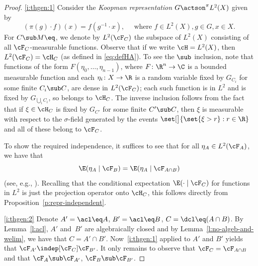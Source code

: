 \skpt
\begin{proof}
\eqref{i:thgen:1}
Consider the \emph{Koopman representation} $G \actson^\pi L^2(X)$ given by
\begin{equation*}
(\pi(g) \cdot f)(x) = f(g^{-1} \cdot x), \quad \text{ where } f \in L^2(X), g \in G, x \in X.
\end{equation*}
For $C \sub M\eq$, we denote by $L^2(\cF_C)$ the subspace of $L^2(X)$ consisting of all $\cF_C$\nobreakdash-measurable functions. Observe that if we write $\cH = L^2(X)$, then $L^2(\cF_C) = \cH_C$ (as defined in \eqref{eq:defHA}). To see the $\sub$ inclusion, note that functions of the form $F(\eta_0, \ldots, \eta_{n-1})$, where $F \colon \R^n \to \C$ is a bounded measurable function and each $\eta_i \colon X \to \R$ is a random variable fixed by $G_{C_i}$ for some finite $C_i \sub C$, are dense in $L^2(\cF_C)$; each such function is in $L^2$ and is fixed by $G_{\bigcup_i C_i}$, so belongs to $\cH_C$. The inverse inclusion follows from the fact that if $\xi \in \cH_C$ is fixed by $G_{C'}$ for some finite $C' \sub C$, then $\xi$ is measurable with respect to the $\sigma$-field generated by the events $\set[\big]{\set{\xi > r} : r \in \R}$ and all of these belong to $\cF_C$.

To show the required independence, it suffices to see that for all $\eta_A \in L^2(\cF_A)$, we have that
\begin{equation*}
\E(\eta_A \mid \cF_B) = \E(\eta_A \mid \cF_{A \cap B})
\end{equation*}
(see, e.g., \cite[Prop.\,5.6]{Kallenberg2002}). Recalling that the conditional expectation $\E(\cdot \mid \cF_C)$ for functions in $L^2$ is just the projection operator onto $\cH_C$, this follows directly from Proposition~\ref{p:repr-independent}.

\eqref{i:thgen:2} Denote $A' = \acl\eq A$, $B' = \acl\eq B$, $C = \dcl\eq (A \cap B)$. By Lemma~\ref{l:acl}, $A'$ and~$B'$ are algebraically closed and by Lemma~\ref{l:no-algeb-and-welim}, we have that $C = A' \cap B'$. Now~\eqref{i:thgen:1} applied to $A'$ and $B'$ yields that $\cF_{A'} \indep[\cF_C] \cF_{B'}$. It only remains to observe that $\cF_C = \cF_{A \cap B}$ and that $\cF_A \sub \cF_{A'}$, $\cF_B \sub \cF_{B'}$.
\end{proof}

